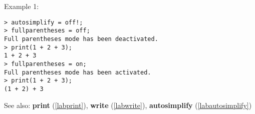 \noindent Example 1: 
\begin{center}\begin{minipage}{15cm}\begin{Verbatim}[frame=single,commandchars=\\\|\~]
> autosimplify = off!;
> fullparentheses = off;
Full parentheses mode has been deactivated.
> print(1 + 2 + 3);
1 + 2 + 3
> fullparentheses = on;
Full parentheses mode has been activated.
> print(1 + 2 + 3);
(1 + 2) + 3
\end{Verbatim}
\end{minipage}\end{center}
See also: \textbf{print} (\ref{labprint}), \textbf{write} (\ref{labwrite}), \textbf{autosimplify} (\ref{labautosimplify})
